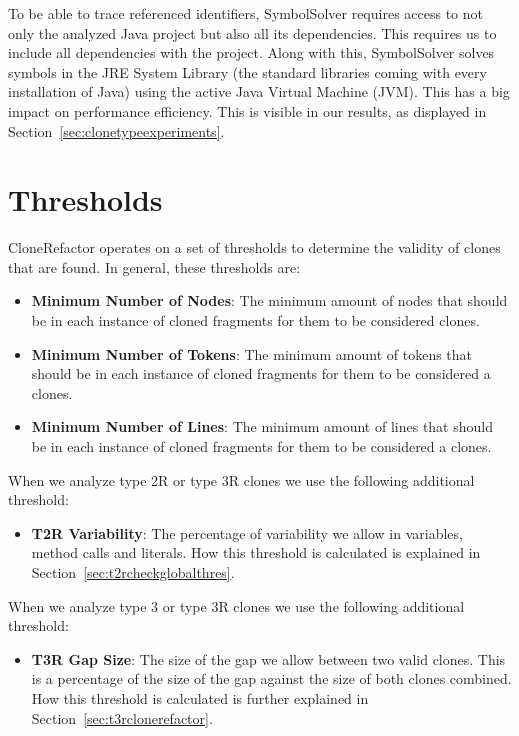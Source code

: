 To be able to trace referenced identifiers, SymbolSolver requires access to not only the analyzed Java project but also all its dependencies. This requires us to include all dependencies with the project. Along with this, SymbolSolver solves symbols in the JRE System Library (the standard libraries coming with every installation of Java) using the active Java Virtual Machine (JVM). This has a big impact on performance efficiency. This is visible in our results, as displayed in Section~\ref{sec:clonetypeexperiments}.


\section{Thresholds}\label{sec:clonerefactorthresholds}
CloneRefactor operates on a set of thresholds to determine the validity of clones that are found. In general, these thresholds are:
\begin{itemize}
  \item \textbf{Minimum Number of Nodes}: The minimum amount of nodes that should be in each instance of cloned fragments for them to be considered clones.
  \item \textbf{Minimum Number of Tokens}: The minimum amount of tokens that should be in each instance of cloned fragments for them to be considered a clones.
  \item \textbf{Minimum Number of Lines}: The minimum amount of lines that should be in each instance of cloned fragments for them to be considered a clones.
\end{itemize}

When we analyze type 2R or type 3R clones we use the following additional threshold:
\begin{itemize}
  \item \textbf{T2R Variability}: The percentage of variability we allow in variables, method calls and literals. How this threshold is calculated is explained in Section~\ref{sec:t2rcheckglobalthres}.
\end{itemize}

When we analyze type 3 or type 3R clones we use the following additional threshold:
\begin{itemize}
  \item \textbf{T3R Gap Size}: The size of the gap we allow between two valid clones. This is a percentage of the size of the gap against the size of both clones combined. How this threshold is calculated is further explained in Section~\ref{sec:t3rclonerefactor}.
\end{itemize}

